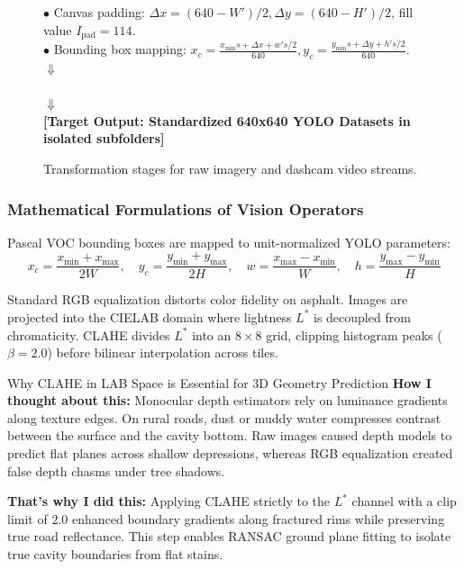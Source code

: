 \begin{figure}[htbp]
\begin{tcolorbox}[colback=gray!5,colframe=gray!50,arc=1mm,title=\textbf{Flowchart 1: Vision and Video Preprocessing Pipeline}]
\begin{center}
{{$\bullet$ Canvas padding: $\Delta x = (640 - W')/2, \Delta y = (640 - H')/2$, fill value $I_{\text{pad}} = 114$. \\
$\bullet$ Bounding box mapping: $x_c = \frac{x_{\min} s + \Delta x + w' s / 2}{640}, y_c = \frac{y_{\min} s + \Delta y + h' s / 2}{640}$.}} \\
$\Downarrow$ \\
 \\
$\Downarrow$ \\
\textbf{[Target Output: Standardized 640x640 YOLO Datasets in isolated subfolders]}
\end{center}
\end{tcolorbox}
\caption{Transformation stages for raw imagery and dashcam video streams.}
\label{fig:vision_flowchart}
\end{figure}

\subsubsection{Mathematical Formulations of Vision Operators}
Pascal VOC bounding boxes are mapped to unit-normalized YOLO parameters:
\begin{equation}
x_c = \frac{x_{\min} + x_{\max}}{2W}, \quad y_c = \frac{y_{\min} + y_{\max}}{2H}, \quad w = \frac{x_{\max} - x_{\min}}{W}, \quad h = \frac{y_{\max} - y_{\min}}{H}
\end{equation}

Standard RGB equalization distorts color fidelity on asphalt. Images are projected into the CIELAB domain where lightness $L^*$ is decoupled from chromaticity. CLAHE divides $L^*$ into an $8\times8$ grid, clipping histogram peaks ($\beta = 2.0$) before bilinear interpolation across tiles.

\begin{designreflection}{Why CLAHE in LAB Space is Essential for 3D Geometry Prediction}
\textbf{How I thought about this:}
Monocular depth estimators rely on luminance gradients along texture edges. On rural roads, dust or muddy water compresses contrast between the surface and the cavity bottom. Raw images caused depth models to predict flat planes across shallow depressions, whereas RGB equalization created false depth chasms under tree shadows.

\textbf{That's why I did this:}
Applying CLAHE strictly to the $L^*$ channel with a clip limit of $2.0$ enhanced boundary gradients along fractured rims while preserving true road reflectance. This step enables RANSAC ground plane fitting to isolate true cavity boundaries from flat stains.
\end{designreflection}

